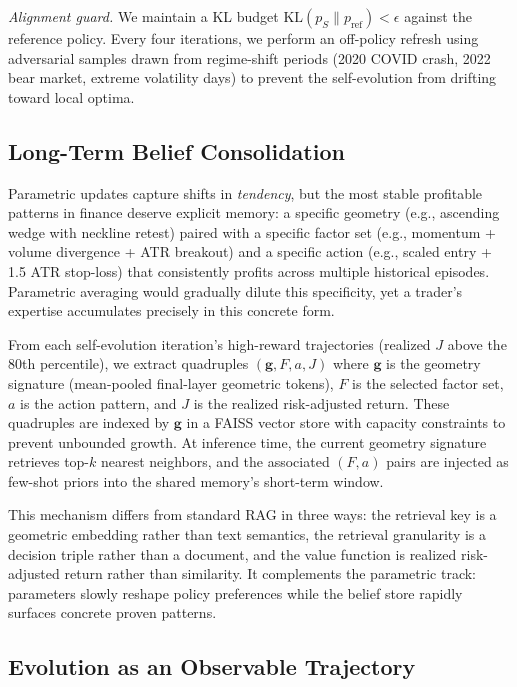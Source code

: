 \emph{Alignment guard.} We maintain a KL budget $\mathrm{KL}(p_S \| p_{\mathrm{ref}}) < \epsilon$ against the reference policy. Every four iterations, we perform an off-policy refresh using adversarial samples drawn from regime-shift periods (2020 COVID crash, 2022 bear market, extreme volatility days) to prevent the self-evolution from drifting toward local optima.

\subsection{Long-Term Belief Consolidation}
\label{sec:belief}

Parametric updates capture shifts in \emph{tendency}, but the most stable profitable patterns in finance deserve explicit memory: a specific geometry (e.g., ascending wedge with neckline retest) paired with a specific factor set (e.g., momentum + volume divergence + ATR breakout) and a specific action (e.g., scaled entry + 1.5 ATR stop-loss) that consistently profits across multiple historical episodes. Parametric averaging would gradually dilute this specificity, yet a trader's expertise accumulates precisely in this concrete form.

From each self-evolution iteration's high-reward trajectories (realized $J$ above the 80th percentile), we extract quadruples $(\mathbf{g}, F, a, J)$ where $\mathbf{g}$ is the geometry signature (mean-pooled final-layer geometric tokens), $F$ is the selected factor set, $a$ is the action pattern, and $J$ is the realized risk-adjusted return. These quadruples are indexed by $\mathbf{g}$ in a FAISS vector store with capacity constraints to prevent unbounded growth. At inference time, the current geometry signature retrieves top-$k$ nearest neighbors, and the associated $(F, a)$ pairs are injected as few-shot priors into the shared memory's short-term window.

This mechanism differs from standard RAG in three ways: the retrieval key is a geometric embedding rather than text semantics, the retrieval granularity is a decision triple rather than a document, and the value function is realized risk-adjusted return rather than similarity. It complements the parametric track: parameters slowly reshape policy preferences while the belief store rapidly surfaces concrete proven patterns.

\subsection{Evolution as an Observable Trajectory}
\label{sec:evolution_curve}

